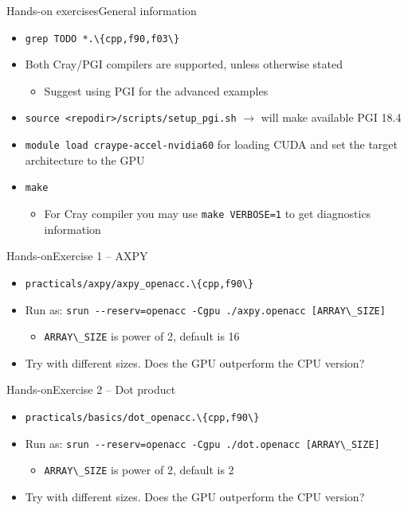 \documentclass[12pt,aspectratio=169]{beamer}
\newcommand\shinline[2][]{\lstinline[style=shstyle,basicstyle=\ttfamily,#1]!#2!}
\begin{document}
\begin{frame}[fragile]{Hands-on exercises}{General information}
  \begin{itemize}
  \item \shinline{grep TODO *.\{cpp,f90,f03\}}
  \item Both Cray/PGI compilers are supported, unless otherwise stated
    \begin{itemize}
    \item Suggest using PGI for the advanced examples
    \end{itemize}
  \item \shinline{source <repodir>/scripts/setup_pgi.sh} $\rightarrow$ will make available PGI 18.4
  \item \shinline{module load craype-accel-nvidia60} for loading CUDA and set the target architecture to the GPU
  \item \shinline{make}
    \begin{itemize}
    \item For Cray compiler you may use \shinline{make VERBOSE=1} to get diagnostics information
    \end{itemize}
  \end{itemize}
\end{frame}

\begin{frame}{Hands-on}{Exercise 1 -- AXPY}
  \begin{itemize}
  \item \shinline{practicals/axpy/axpy_openacc.\{cpp,f90\}}
  \item Run as: \shinline{srun --reserv=openacc -Cgpu ./axpy.openacc [ARRAY\_SIZE]}
    \begin{itemize}
    \item \shinline{ARRAY\_SIZE} is power of 2, default is 16
    \end{itemize}
  \item Try with different sizes. Does the GPU outperform the CPU version?
  \end{itemize}
\end{frame}

\begin{frame}{Hands-on}{Exercise 2 -- Dot product}
  \begin{itemize}
  \item \shinline{practicals/basics/dot_openacc.\{cpp,f90\}}
  \item Run as: \shinline{srun --reserv=openacc -Cgpu ./dot.openacc [ARRAY\_SIZE]}
    \begin{itemize}
    \item \shinline{ARRAY\_SIZE} is power of 2, default is 2
    \end{itemize}
  \item Try with different sizes. Does the GPU outperform the CPU version?
  \end{itemize}
\end{frame}
\end{document}
